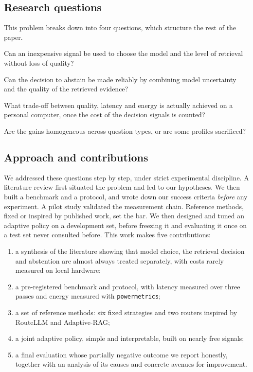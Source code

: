\documentclass[11pt,a4paper]{article}
\begin{document}
\subsection{Research questions}

This problem breaks down into four questions, which structure the rest of the paper.

\begin{description}[style=sameline,leftmargin=1.2cm]
\item[RQ1] Can an inexpensive signal be used to choose the model and the level of retrieval without
loss of quality?
\item[RQ2] Can the decision to abstain be made reliably by combining model uncertainty and the quality
of the retrieved evidence?
\item[RQ3] What trade-off between quality, latency and energy is actually achieved on a personal
computer, once the cost of the decision signals is counted?
\item[RQ4] Are the gains homogeneous across question types, or are some profiles sacrificed?
\end{description}

\subsection{Approach and contributions}

We addressed these questions step by step, under strict experimental discipline. A literature review
first situated the problem and led to our hypotheses. We then built a benchmark and a protocol, and
wrote down our success criteria \emph{before} any experiment. A pilot study validated the measurement
chain. Reference methods, fixed or inspired by published work, set the bar. We then designed and tuned
an adaptive policy on a development set, before freezing it and evaluating it once on a test set never
consulted before. This work makes five contributions:

\begin{enumerate}
\item a synthesis of the literature showing that model choice, the retrieval decision and abstention
are almost always treated separately, with costs rarely measured on local hardware;
\item a pre-registered benchmark and protocol, with latency measured over three passes and energy
measured with \texttt{powermetrics};
\item a set of reference methods: six fixed strategies and two routers inspired by RouteLLM and
Adaptive-RAG;
\item a joint adaptive policy, simple and interpretable, built on nearly free signals;
\item a final evaluation whose partially negative outcome we report honestly, together with an analysis
of its causes and concrete avenues for improvement.
\end{enumerate}
\end{document}
